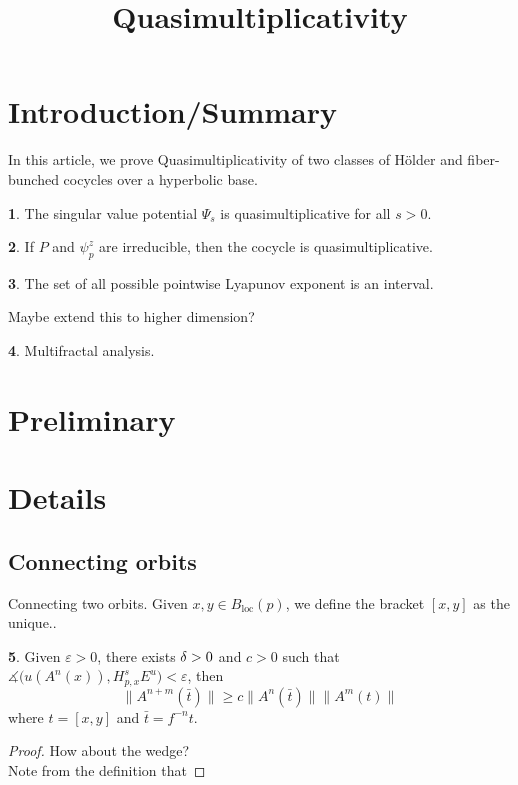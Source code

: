 \documentclass[11pt,oneside,reqno]{amsart}
\numberwithin{equation}{section}
\numberwithin{figure}{section}
\theoremstyle{definition}
\newtheorem{thm}{\protect\theoremname}[section]
\theoremstyle{definition}
\theoremstyle{definition}
\theoremstyle{definition}
\newtheorem{lem}[thm]{\protect\lemmaname}
\theoremstyle{remark}
\theoremstyle{definition}
\theoremstyle{definition}
\theoremstyle{definition}
\def\ep{\varepsilon}
\def\blp{B_{\text{loc}}(p)}
\def\hol{H\"older }
\def\fb{fiber-bunched }
\def\mangle{\measuredangle}
\def\psip{\psi_p}
\providecommand{\lemmaname}{Lemma}
\providecommand{\theoremname}{Theorem}
\providecommand{\theoremname}{Theorem}
\begin{document}
\title{Quasimultiplicativity}

\maketitle
\section{Introduction/Summary}
In this article, we prove Quasimultiplicativity of two classes of \hol and \fb cocycles over a hyperbolic base.

\begin{thm}
The singular value potential $\Psi_s$ is quasimultiplicative for all $s>0$.
\end{thm}

\begin{thm}
If $P$ and $\psip^z$ are irreducible, then the cocycle is quasimultiplicative.
\end{thm}

\begin{thm}
The set of all possible pointwise Lyapunov exponent is an interval. 
\end{thm}
Maybe extend this to higher dimension?

\begin{thm}
Multifractal analysis.
\end{thm}

\newpage
\section{Preliminary}
\section{Details}
\subsection{Connecting orbits}



Connecting two orbits. Given $x,y \in \blp$, we define the bracket $[x,y]$ as the unique..
\begin{lem}
Given $\ep>0$, there exists $\delta>0$ and $c>0$ such that $\mangle \Big(u(A^n(x)),H^s_{p,x}E^u \Big)<\ep $, then 
$$\|A^{n+m}(\bar{t})\| \geq c\|A^n(\bar{t})\| \|A^m(t)\|$$
where $t = [x,y]$ and $\bar{t} = f^{-n}t$.
\end{lem}
\begin{proof}
How about the wedge?\\
Note from the definition that 
\end{proof}


%
%
\end{document}

